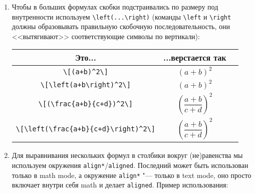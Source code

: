 \begin{enumerate}
\item
	Чтобы в больших формулах скобки подстраивались по размеру под внутренности
	используем \verb'\left(...\right)'
	(команды \verb'\left' и \verb'\right' должны образовывать правильную скобочную последовательность,
	они <<вытягивают>> соответствующие символы по вертикали):
	\begin{center}\begin{tabular}{|c|c|c|}
		\hline Это... & ...верстается так & \\
		\hline \verb'\[(a+b)^2\]'                        & \begin{minipage}{3cm}\[(a+b)^2\]\end{minipage} \ok \\
		\hline \verb'\[\left(a+b\right)^2\]'             & \begin{minipage}{3cm}\[\left(a+b\right)^2\]\end{minipage} \ok \\
		\hline \verb'\[(\frac{a+b}{c+d})^2\]'            & \begin{minipage}{3cm}\[(\frac{a+b}{c+d})^2\]\end{minipage} \bad \\
		\hline \verb'\[\left(\frac{a+b}{c+d}\right)^2\]' & \begin{minipage}{3cm}\[\left(\frac{a+b}{c+d}\right)^2\]\end{minipage} \ok \\
		\hline
	\end{tabular}\end{center}

\item
	Для выравнивания нескольких формул в столбики вокруг (не)равенства
	мы используем окружения \texttt{align*}/\texttt{aligned}.
	Последний может быть использован только в math mode, а окружение \texttt{align*}
	"--- только в text mode, оно просто включает внутри себя math и делает \texttt{aligned}.
	Пример использования:


\end{enumerate}
